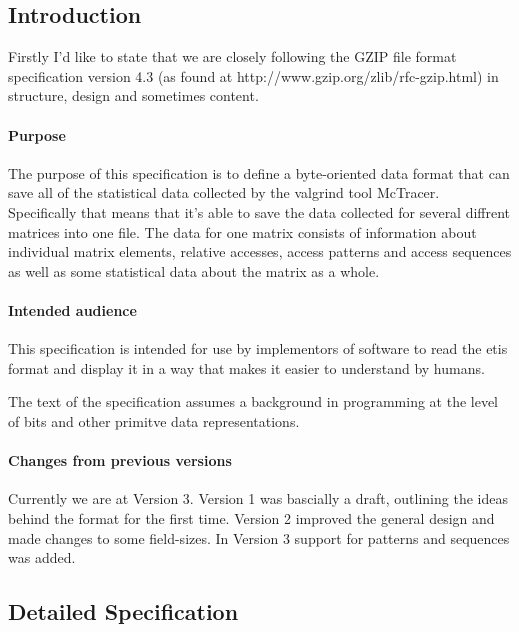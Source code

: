 \subsection{Introduction}

Firstly I'd like to state that we are closely following the GZIP file format specification version 4.3 (as found at http://www.gzip.org/zlib/rfc-gzip.html) in structure, design and sometimes content.

\paragraph{Purpose}

The purpose of this specification is to define a byte-oriented data format that can save all of the statistical data collected by the valgrind tool McTracer. Specifically that means that it's able to save
the data collected for several diffrent matrices into one file. The data for one matrix consists of information about individual matrix elements, relative accesses, access patterns and access sequences as
well as some statistical data about the matrix as a whole.

\paragraph{Intended audience}

This specification is intended for use by implementors of software to read the etis format and display it in a way that makes it easier to understand by humans.

The text of the specification assumes a background in programming at the level of bits and other primitve data representations.

\paragraph{Changes from previous versions}
Currently we are at Version 3. Version 1 was bascially a draft, outlining the ideas behind the format for the first time. Version 2 improved the general design and made changes to some field-sizes. 
In Version 3 support for patterns and sequences was added.

\newpage
\subsection{Detailed Specification} 

